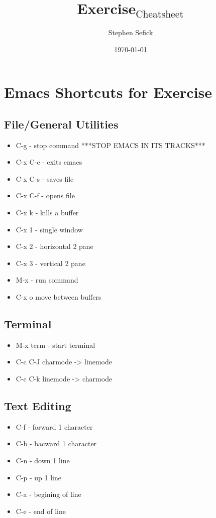 \documentclass[11pt]{article}
\title{Exercise$_{\mathrm{Cheatsheet}}$}
\author{Stephen Sefick}
\date{\today}
\begin{document}
\maketitle

\setcounter{tocdepth}{3}
\tableofcontents
\vspace*{1cm}
\section{Emacs Shortcuts for Exercise}
\label{sec-1}
\subsection{File/General Utilities}
\label{sec-1-1}

\begin{itemize}
\item C-g - stop command ***STOP EMACS IN ITS TRACKS***
\item C-x C-c - exits emacs
\item C-x C-s - saves file
\item C-x C-f - opens file
\item C-x k - kills a buffer
\item C-x 1 - single window
\item C-x 2 - horizontal 2 pane
\item C-x 3 - vertical 2 pane
\item M-x - run command
\item C-x o move between buffers
\end{itemize}
\subsection{Terminal}
\label{sec-1-2}

\begin{itemize}
\item M-x term - start terminal
\item C-c C-J charmode -> linemode
\item C-c C-k linemode -> charmode
\end{itemize}
\subsection{Text Editing}
\label{sec-1-3}

\begin{itemize}
\item C-f - forward 1 character
\item C-b - bacward 1 character
\item C-n - down 1 line
\item C-p - up 1 line
\item C-a - begining of line
\item C-e - end of line
\end{itemize}
\end{document}
